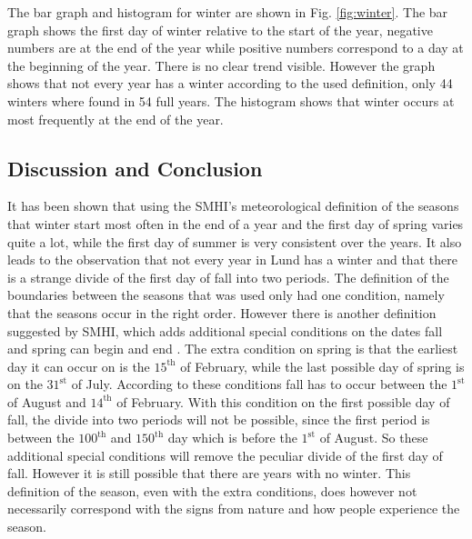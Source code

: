 The bar graph and histogram for winter are shown in Fig. \ref{fig:winter}. The bar graph shows the first day of winter relative to the start of the year, negative numbers are at the end of the year while positive numbers correspond to a day at the beginning of the year. There is no clear trend visible. However the graph shows that not every year has a winter according to the used definition, only 44 winters where found in 54 full years. The histogram shows that winter occurs at most frequently at the end of the year. 

\subsection{Discussion and Conclusion}

It has been shown that using the SMHI's meteorological definition of the seasons that winter start most often in the end of a year and the first day of spring varies quite a lot, while the first day of summer is very consistent over the years. It also leads to the observation that not every year in Lund has a winter and that there is a strange divide of the first day of fall into two periods. The definition of the boundaries between the seasons that was used only had one condition, namely that the seasons occur in the right order. However there is another definition suggested by SMHI, which adds additional special conditions on the dates fall and spring can begin and end \cite{SMHI}. The extra condition on spring is that the earliest day it can occur on is the $15^\text{th}$ of February, while the last possible day of spring is on the $31^\text{st}$ of July. According to these conditions fall has to occur between the $1^\text{st}$ of August and $14^\text{th}$ of February. With this condition on the first possible day of fall, the divide into two periods will not be possible, since the first period is between the $100^\text{th}$ and $150^\text{th}$ day which is before the $1^\text{st}$ of August. So these additional special conditions will remove the peculiar divide of the first day of fall. However it is still possible that there are years with no winter. This definition of the season, even with the extra conditions, does however not necessarily correspond with the signs from nature and how people experience the season. 

















